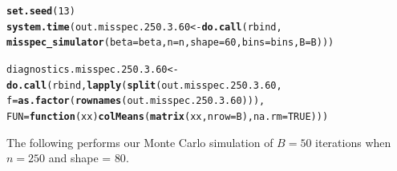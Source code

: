 \documentclass[11pt]{article}\usepackage[]{graphicx}\usepackage[]{color}
\makeatletter
\newcommand{\hlnum}[1]{\textcolor[rgb]{0.686,0.059,0.569}{#1}}%
\newcommand{\hlstd}[1]{\textcolor[rgb]{0.345,0.345,0.345}{#1}}%
\newcommand{\hlkwa}[1]{\textcolor[rgb]{0.161,0.373,0.58}{\textbf{#1}}}%
\newcommand{\hlkwb}[1]{\textcolor[rgb]{0.69,0.353,0.396}{#1}}%
\newcommand{\hlkwc}[1]{\textcolor[rgb]{0.333,0.667,0.333}{#1}}%
\newcommand{\hlkwd}[1]{\textcolor[rgb]{0.737,0.353,0.396}{\textbf{#1}}}%
\newenvironment{kframe}{%
 \def\at@end@of@kframe{}%
 \ifinner\ifhmode%
  \def\at@end@of@kframe{\end{minipage}}%
  \begin{minipage}{\columnwidth}%
 \fi\fi%
 \def\FrameCommand##1{\hskip\@totalleftmargin \hskip-\fboxsep
 \colorbox{shadecolor}{##1}\hskip-\fboxsep
     \hskip-\linewidth \hskip-\@totalleftmargin \hskip\columnwidth}%
 \MakeFramed {\advance\hsize-\width
   \@totalleftmargin\z@ \linewidth\hsize
   \@setminipage}}%
 {\par\unskip\endMakeFramed%
 \at@end@of@kframe}
\newenvironment{knitrout}{}{} %
\makeatother
\begin{document}
\begin{knitrout}
\color{fgcolor}\begin{kframe}
\begin{alltt}
\hlkwd{set.seed}\hlstd{(}\hlnum{13}\hlstd{)}
\hlkwd{system.time}\hlstd{(out.misspec.250.3.60} \hlkwb{<-} \hlkwd{do.call}\hlstd{(rbind,}
  \hlkwd{misspec_simulator}\hlstd{(}\hlkwc{beta} \hlstd{= beta,} \hlkwc{n} \hlstd{= n,} \hlkwc{shape} \hlstd{=} \hlnum{60}\hlstd{,} \hlkwc{bins} \hlstd{= bins,} \hlkwc{B} \hlstd{= B)))}
\end{alltt}


{\ttfamily\noindent\bfseries\color{errorcolor}{\#\# Error in chol.default(crossprod(x) + lambda[j] * diag(v)): the leading minor of order 5 is not positive definite}}

{\ttfamily\noindent\itshape\color{messagecolor}{\#\# Timing stopped at: 0.183 0 0.183}}\begin{alltt}
\hlstd{diagnostics.misspec.250.3.60} \hlkwb{<-} \hlkwd{do.call}\hlstd{(rbind,} \hlkwd{lapply}\hlstd{(}\hlkwd{split}\hlstd{(out.misspec.250.3.60,}
  \hlkwc{f} \hlstd{=} \hlkwd{as.factor}\hlstd{(}\hlkwd{rownames}\hlstd{(out.misspec.250.3.60))),}
  \hlkwc{FUN} \hlstd{=} \hlkwa{function}\hlstd{(}\hlkwc{xx}\hlstd{)} \hlkwd{colMeans}\hlstd{(}\hlkwd{matrix}\hlstd{(xx,} \hlkwc{nrow} \hlstd{= B),} \hlkwc{na.rm} \hlstd{=} \hlnum{TRUE}\hlstd{)))}
\end{alltt}


{\ttfamily\noindent\bfseries\color{errorcolor}{\#\# Error in split(out.misspec.250.3.60, f = as.factor(rownames(out.misspec.250.3.60))): object 'out.misspec.250.3.60' not found}}\end{kframe}
\end{knitrout}


The following performs our Monte Carlo simulation of $B = 50$ iterations 
when $n = 250$ and shape = $80$.
\end{document}
